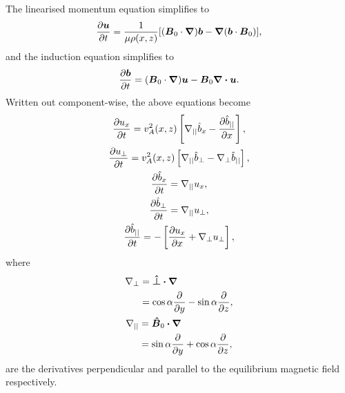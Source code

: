 The linearised momentum equation simplifies to
\begin{equation}
    \label{eq:chap_4_linearised_momentum_eqn}
    \begin{aligned}
        \pdv{\boldsymbol{u}}{t}=\frac{1}{\mu\rho(x,z)}\qty[(\boldsymbol{B}_0\cdot\grad)\boldsymbol{b} - \grad\qty(\boldsymbol{b}\cdot\boldsymbol{B}_0)],
    \end{aligned}
\end{equation}
and the induction equation simplifies to
\begin{equation}
    \label{eq:chap_4_linearised_induction_eqn}
    \begin{aligned}
    \pdv{\boldsymbol{b}}{t}=(\boldsymbol{B}_0\cdot\grad)\boldsymbol{u} - \boldsymbol{B}_0\div{\boldsymbol{u}}.
    \end{aligned}
\end{equation}
Written out component-wise, the above equations become
\begin{gather}
    \label{eq:chap_4_ux_eqn1}
    \pdv{u_x}{t}=v_A^2(x,z)\left[\nabla_{||}\hat{b}_x - \pdv{\hat{b}_{||}}{x}\right],\\
    \label{eq:chap_4_u_perp_eqn1}
    \pdv{u_\perp}{t}=v_A^2(x,z)\left[\nabla_{||}\hat{b}_\perp-\nabla_\perp \hat{b}_{||}\right],\\
    \label{eq:chap_4_bx_eqn1}
    \pdv{\hat{b}_x}{t}=\nabla_{||}u_x,\\
    \label{eq:chap_4_b_perp_eqn1}
    \pdv{\hat{b}_\perp}{t}=\nabla_{||}u_{\perp},\\
    \label{eq:chap_4_b_par_eqn1}
    \pdv{\hat{b}_{||}}{t}=-\left[\pdv{u_x}{x}+\nabla_\perp u_{\perp}\right],
\end{gather}
where
\begin{gather}
    \label{eq:nabla_perp}
    \begin{aligned}
    \nabla_\perp &= \vec{\hat{\perp}}\vdot\grad \\
    &= \cos\alpha\pdv{}{y}-\sin\alpha\pdv{}{z},
    \end{aligned} \\
    \label{eq:nabla_par}
    \begin{aligned}
    \nabla_{||} &= \vec{\hat{B}}_0\vdot\grad \\
    &= \sin\alpha\pdv{}{y}+\cos\alpha\pdv{}{z},
    \end{aligned}
\end{gather}
are the derivatives perpendicular and parallel to the
equilibrium magnetic field respectively.

